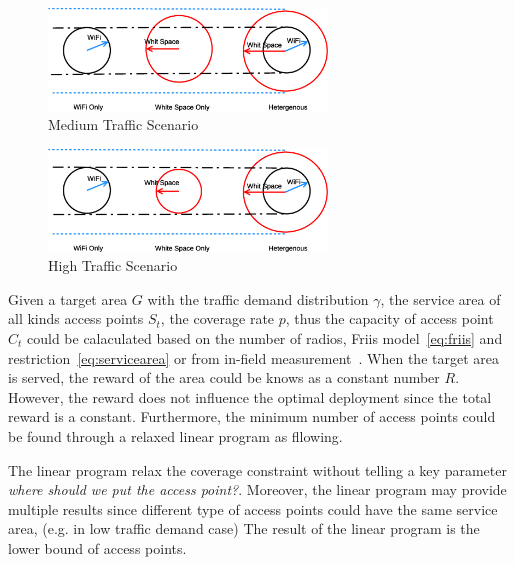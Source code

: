 \begin{figure}
\centering
\includegraphics[width=74mm]{figures/mediumtraffic}
\vspace{-0.1in}
\caption{Medium Traffic Scenario}                                                                 
\label{fig:mediumtraffic}
\vspace{-0.1in}
\end{figure}


\begin{figure}
\centering
\includegraphics[width=74mm]{figures/hightraffic}
\vspace{-0.1in}
\caption{High Traffic Scenario}                                                                 
\label{fig:hightraffic}
\vspace{-0.1in}
\end{figure}

Given a target area $G$ with the traffic demand distribution $\gamma$, the service area 
of all kinds access points $S_t$, the coverage rate $p$, thus the capacity of access point $C_t$ could 
be calaculated based on the number of radios, Friis model~\ref{eq:friis} and restriction~\ref{eq:servicearea}
or from in-field measurement~\cite{cuileveraging}. When the target area is served, the reward of the area 
could be knows as a constant number $R$. However, the reward does not influence the optimal deployment since 
the total reward is a constant. Furthermore, the minimum number of access points could be found through 
a relaxed linear program as fllowing. 



The linear program relax the coverage constraint without telling a key parameter
{\it where should we put the access point?}. Moreover, the linear program may provide 
multiple results since different type of access points could have the same service area, 
(e.g. in low traffic demand case) The result of the linear program is the lower bound of 
access points. 

